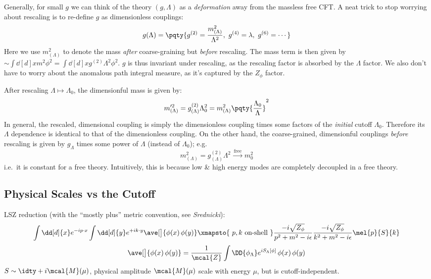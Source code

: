 \documentclass[a4paper
	,10pt
]{article}
\begin{document}
	Generally, for small $g$ we can think of the theory $(g,\Lambda)$ as a \textit{deformation} away from the massless free CFT. A neat trick to stop worrying about rescaling is to re-define $g$ as dimensionless couplings:
	\begin{equation}
		g(\Lambda) = \pqty{
			g^{(2)} = \frac{m^2_{(\Lambda)}}{\Lambda^2},
			\ g^{(4)} = \lambda,
			\ g^{(6)} = \cdots
		}
	\end{equation}
	Here we use $m^2_{(\Lambda)}$ to denote the mass \textit{after} coarse-graining but \textit{before} rescaling. The mass term is then given by $
		\sim \int \dd[d]{x} m^2 \phi^2
		= \int \dd[d]{x} g^{(2)} \Lambda^2 \phi^2
	$. $g$ is thus invariant under rescaling, as the rescaling factor is absorbed by the $\Lambda$ factor. We also don't have to worry about the anomalous path integral measure, as it's captured by the $Z_\phi$ factor. 
	
	After rescaling $\Lambda \mapsto \Lambda_0$, the dimensionful mass is given by:
	\begin{equation}
		m'^2_{(\Lambda)}
		= g^{(2)}_{(\Lambda)} \Lambda_0^2
		= m^2_{(\Lambda)}
			\pqty{\frac{\Lambda_0}{\Lambda}}^2
	\end{equation}
	In general, the rescaled, dimensional coupling is simply the dimensionless coupling times some factors of the \textit{initial} cutoff $\Lambda_0$. Therefore its $\Lambda$ dependence is identical to that of the dimensionless coupling. On the other hand, the coarse-grained, dimensionful couplings \textit{before} rescaling is given by $g_{\Lambda}$ times some power of $\Lambda$ (instead of $\Lambda_0$); e.g.
	\begin{equation}
		m^2_{(\Lambda)}
		= g^{(2)}_{(\Lambda)} \Lambda^2
		\xrightarrow{\ \text{free}\ }
		m_0^2
	\end{equation}
	i.e.\ it is constant for a free theory. Intuitively, this is because low \& high energy modes are completely decoupled in a free theory.
	
	\begin{figure}[!h]
	\centering
	\end{figure}
\subsection{Physical Scales vs the Cutoff}
	LSZ reduction (with the ``mostly plus'' metric convention, see \textit{Srednicki}):
	\begin{equation}
		\int \dd[d]{x} e^{-ip\cdot x}
		\int \dd[d]{y} e^{+ik\cdot y}
		\ave[\big]{\phi(x)\,\phi(y)}
	\xmapsto{\ p,k\ \text{on-shell}\ }
		\frac{-i\sqrt{Z_\phi}}{p^2 + m^2 - i\epsilon}
		\frac{-i\sqrt{Z_\phi}}{k^2 + m^2 - i\epsilon}
		\mel{p}{S}{k}
	\end{equation}
	\begin{equation}
		\ave[\big]{\phi(x)\,\phi(y)}
		= \frac{1}{\mcal{Z}}
			\int \DD{\phi_\Lambda} e^{iS_\Lambda[\phi]}\,
			\phi(x)\,\phi(y)
	\end{equation}
	$S \sim \idty + i\mcal{M}(\mu)$, physical amplitude $\mcal{M}(\mu)$ scale with energy $\mu$, but is cutoff-independent. 
	
\end{document}
